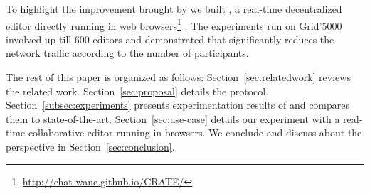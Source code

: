 To highlight the improvement brought by \SPRAY we built \CRATE, a
real-time decentralized editor directly running in web
browsers\footnote{\url{http://chat-wane.github.io/CRATE/}} . The experiments run on Grid'5000
involved up till 600 editors and demonstrated that \SPRAY significantly
reduces the network traffic according to the number of
participants. 

The rest of this paper is organized as follows:
Section~\ref{sec:relatedwork} reviews the related
work. Section~\ref{sec:proposal} details the \SPRAY
protocol. Section~\ref{subsec:experiments} presents experimentation
results of \SPRAY and compares them to
state-of-the-art. Section~\ref{sec:use-case} details our experiment
with \CRATE a real-time collaborative editor running in browsers. We
conclude and discuss about the perspective in
Section~\ref{sec:conclusion}.

